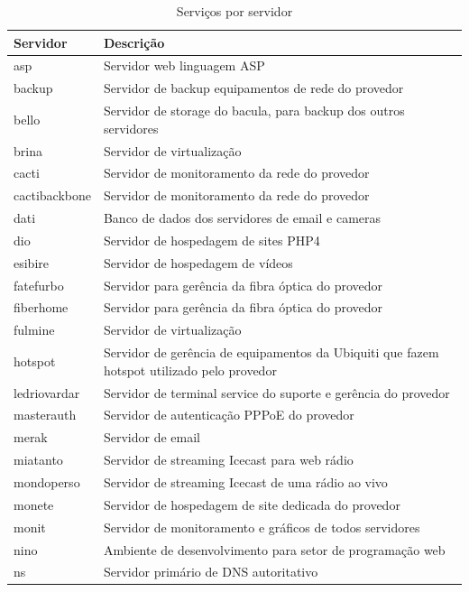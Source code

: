 \begin{table}
\caption {Serviços por servidor}
\label{tab:servporservidor}
\begin{center}
\begin{tabular}{|l|p{12cm}|}\hline
Servidor & Descrição\\\hline
asp & Servidor web linguagem ASP\\\hline
backup & Servidor de backup equipamentos de rede do provedor\\\hline
bello & Servidor de storage do bacula, para backup dos outros servidores\\\hline
brina & Servidor de virtualização\\\hline
cacti & Servidor de monitoramento da rede do provedor\\\hline
cactibackbone & Servidor de monitoramento da rede do provedor\\\hline
dati & Banco de dados dos servidores de email e cameras\\\hline
dio & Servidor de hospedagem de sites PHP4\\\hline
esibire & Servidor de hospedagem de vídeos\\\hline
fatefurbo & Servidor para gerência da fibra óptica do provedor\\\hline
fiberhome & Servidor para gerência da fibra óptica do provedor\\\hline
fulmine & Servidor de virtualização\\\hline
hotspot & Servidor de gerência de equipamentos da Ubiquiti que fazem hotspot utilizado pelo provedor\\\hline
ledriovardar & Servidor de terminal service do suporte e gerência do provedor\\\hline
masterauth & Servidor de autenticação PPPoE do provedor\\\hline
merak & Servidor de email\\\hline
miatanto & Servidor de streaming Icecast para web rádio\\\hline
mondoperso & Servidor de streaming Icecast de uma rádio ao vivo\\\hline
monete & Servidor de hospedagem de site dedicada do provedor\\\hline
monit & Servidor de monitoramento e gráficos de todos servidores\\\hline
nino & Ambiente de desenvolvimento para setor de programação web\\\hline
ns & Servidor primário de DNS autoritativo\\\hline

\end{tabular}
\end{center}
\end{table}
